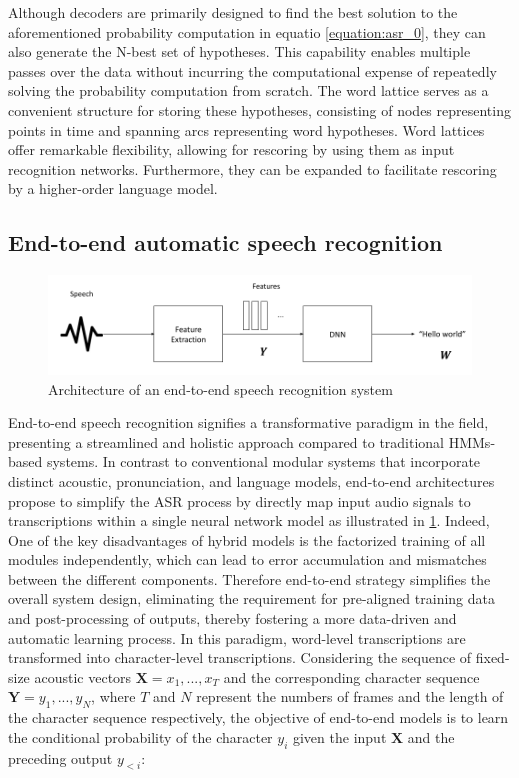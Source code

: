 Although decoders are primarily designed to find the best solution to the aforementioned probability computation in equatio \ref{equation:asr_0}, they can also generate the N-best set of hypotheses. This capability enables multiple passes over the data without incurring the computational expense of repeatedly solving the probability computation from scratch. The word lattice \cite{richardson1995lattice} serves as a convenient structure for storing these hypotheses, consisting of nodes representing points in time and spanning arcs representing word hypotheses.
Word lattices offer remarkable flexibility, allowing for rescoring by using them as input recognition networks. Furthermore, they can be expanded to facilitate rescoring by a higher-order language model.


\newpage
\subsection{End-to-end automatic speech recognition} %
\label{section:SOTAE2E}
\begin{figure}
    \centering
    \includegraphics[width=\textwidth]{imgs/End2End_architeccture.png}
    \caption{Architecture of an end-to-end speech recognition system}
    \label{fig:e2e_archi}
\end{figure}
 End-to-end speech recognition signifies a transformative paradigm in the field, presenting a streamlined and holistic approach compared to traditional \acp{HMM}-based systems. In contrast to conventional modular systems that incorporate distinct acoustic, pronunciation, and language models, end-to-end architectures propose to simplify the \ac{ASR} process by directly map input audio signals to transcriptions within a single neural network model as illustrated in \ref{fig:e2e_archi}. Indeed, One of the key disadvantages of hybrid models is the factorized training of all modules independently, which can lead to error accumulation and mismatches between the different components. Therefore end-to-end strategy simplifies the overall system design, eliminating the requirement for pre-aligned training data and post-processing of outputs, thereby fostering a more data-driven and automatic learning process.
 In this paradigm, word-level transcriptions are transformed into character-level transcriptions. Considering the sequence of fixed-size acoustic vectors $\boldsymbol{X}=x_1,...,x_T$ and the corresponding character sequence $\boldsymbol{Y}=y_1,...,y_N$, where $T$ and $N$ represent the numbers of frames and the length of the character sequence respectively, the objective of end-to-end models is to learn the conditional probability of the character $y_i$ given the input $\boldsymbol{X}$ and the preceding output $y_{<i}$:

